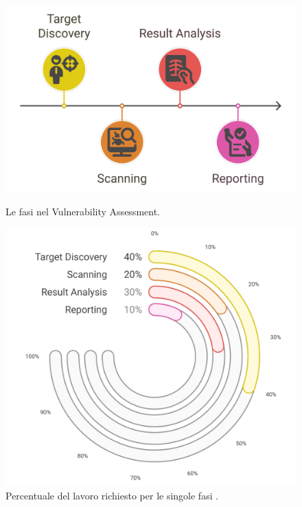         \begin{figure}[h!]
            \centering
                \begin{minipage}{0.5\textwidth}
                    \centering
                    \includegraphics[width=1.0\textwidth]{Immagini/VA_phases_pentesting.png}
                    \caption{Le fasi nel Vulnerability Assessment.}
                \end{minipage}\hfill
                \begin{minipage}{0.5\textwidth}
                    \centering
                    \includegraphics[width=1.0\textwidth]{Immagini/VA_workoload_percentage.png}
                    \caption{Percentuale del lavoro richiesto per le singole fasi \cite{VAPT_Techniques}.}
                \end{minipage}
        \end{figure}

